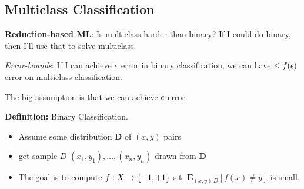 \subsection{Multiclass Classification}
\label{sec:multiclass}

\textbf{Reduction-based ML}: Is multiclass harder than binary? If I
could do binary, then I'll use that to solve multiclass.

\emph{Error-bounds}: If I can achieve $\epsilon$ error in binary
classification, we can have $\le f(\epsilon)$ error on multiclass
classification.

The big assumption is that we can achieve $\epsilon$ error.

\textbf{Definition:} Binary Classification.
\begin{itemize}
\item Assume some distribution $\mathbf{D}$ of $(x,y)$ pairs
\item get sample $D$ $(x_1,y_1),\dots,(x_n,y_n)$ drawn from $\mathbf{D}$
\item The goal is to compute $f:X\rightarrow \{-1, +1\}$
  s.t. $\mathbf{E}_{(x,y)~D}[f(x)\neq y]$ is small.
\end{itemize}

